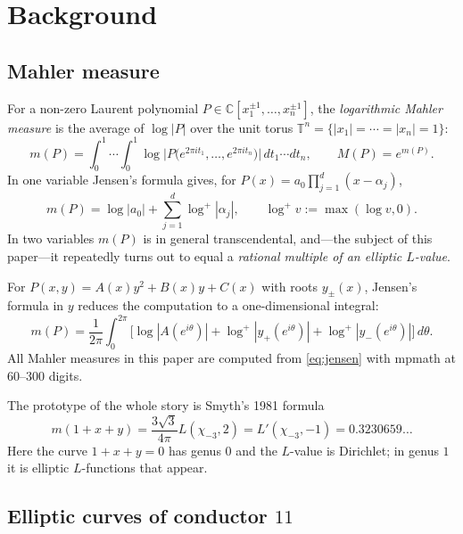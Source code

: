 \documentclass[preprint,12pt]{elsarticle}
\theoremstyle{definition}
\theoremstyle{remark}
\newcommand{\C}{\mathbb{C}}
\newcommand{\T}{\mathbb{T}}
\begin{document}
\section{Background}
\label{sec:background}

\subsection{Mahler measure}

For a non-zero Laurent polynomial
$P\in\C[x_1^{\pm1},\dots,x_n^{\pm1}]$, the \emph{logarithmic Mahler measure}
is the average of $\log|P|$ over the unit torus
$\T^n=\{|x_1|=\cdots=|x_n|=1\}$:
\[
  m(P)=\int_0^1\!\!\cdots\!\int_0^1
  \log\big|P\big(e^{2\pi i t_1},\dots,e^{2\pi i t_n}\big)\big|\,dt_1\cdots dt_n,
  \qquad M(P)=e^{m(P)}.
\]
In one variable Jensen's formula gives, for $P(x)=a_0\prod_{j=1}^d(x-\alpha_j)$,
\[
  m(P)=\log|a_0|+\sum_{j=1}^d\log^+|\alpha_j|,\qquad \log^+v:=\max(\log v,0).
\]
In two variables $m(P)$ is in general transcendental, and---the subject of
this paper---it repeatedly turns out to equal a \emph{rational multiple of an
elliptic $L$-value}.

For $P(x,y)=A(x)y^2+B(x)y+C(x)$ with roots $y_\pm(x)$, Jensen's formula in
$y$ reduces the computation to a one-dimensional integral:
\begin{equation}\label{eq:jensen}
  m(P)=\frac1{2\pi}\int_0^{2\pi}\Big[\log|A(e^{i\theta})|
  +\log^+|y_+(e^{i\theta})|+\log^+|y_-(e^{i\theta})|\Big]\,d\theta.
\end{equation}
All Mahler measures in this paper are computed from \eqref{eq:jensen} with
mpmath \cite{mpmath} at $60$--$300$ digits.

The prototype of the whole story is Smyth's 1981 formula \cite{Smyth}
\[
  m(1+x+y)=\frac{3\sqrt3}{4\pi}L(\chi_{-3},2)=L'(\chi_{-3},-1)=0.3230659\ldots
\]
Here the curve $1+x+y=0$ has genus $0$ and the $L$-value is Dirichlet; in
genus $1$ it is elliptic $L$-functions that appear.

\subsection{Elliptic curves of conductor \texorpdfstring{$11$}{11}}
\end{document}
